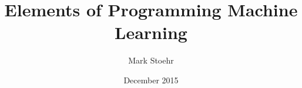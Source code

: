 \documentclass{ucetd}
\title{Elements of Programming Machine Learning}
\author{Mark Stoehr}
\date{December 2015}
\theoremstyle{AddisonWesley}
\begin{document}
\maketitle

\makecopyright
\makededication
\makeepigraph


\tableofcontents
\listoffigures
\listoftables

\acknowledgments

\abstract


\mainmatter









%
%
\end{document}
